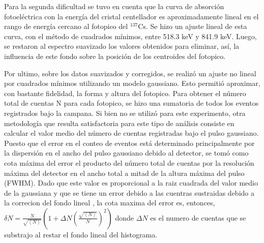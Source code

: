 \documentclass[twoside]{article}
\begin{document}
\begin{multicols}{2}
Para la segunda dificultad se tuvo en cuenta que la curva de absorción fotoeléctrica con la energía del cristal centellador es aproximadamente lineal en el rango de energía cercano al fotopico del ${^{137}}$Cs. Se hizo un ajuste lineal de esta curva, con el método de cuadrados mínimos, entre 518.3 keV y 841.9 keV. Luego, se restaron al espectro suavizado los valores obtenidos para eliminar, así, la influencia de este fondo sobre la posición de los centroides del fotopico.

Por ultimo, sobre los datos suavizados y corregidos, se realizó un ajuste no lineal por cuadrados mínimos utilizando un modelo gaussiano. Esto permitió aproximar, con bastante fidelidad, la forma y altura del fotopico. Para obtener el número total de cuentas N para cada fotopico, se hizo una sumatoria de todos los eventos registrados bajo la campana. Si bien no se utilizó para este experimento, otra metodología que resulta satisfactoria para este tipo de análisis consiste en calcular el valor medio del número de cuentas registradas bajo el pulso gaussiano. Puesto que el error en el conteo de eventos está determinado principalmente por la dispersión en el ancho del pulso gaussiano debido al detector, se tomó como cota máxima del error el producto del número total de cuentas por la resolución máxima del detector en el ancho total a mitad de la altura máxima del pulso (FWHM). Dado que este valor es proporcional a la raiz cuadrada del valor medio de la gaussiana{\cite{Ortec-Gamma-Ray}} y que se tiene un error debido a las cuentras sustraidas debido a la correcion del fondo lineal , la cota maxima del error es, entonces, ${\delta N = \frac{N}{\sqrt{ \left\langle N \right\rangle }} \left( 1 + \Delta N {\left( \frac{\sqrt{ \left\langle N \right\rangle}}{N}  \right)}^2  \right) }$ donde ${ \Delta N}$ es el numero de cuentas que se substrajo al restar el fondo lineal del histograma. 


\end{multicols}
\end{document}
